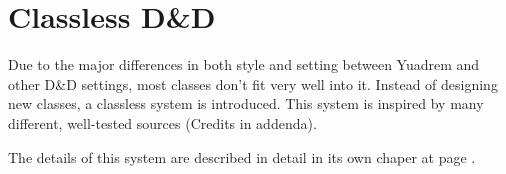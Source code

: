 \section*{Classless D\&D} \label{sec::classlessdnd}

Due to the major differences in both style and setting between Yuadrem and other D\&D settings, most classes don't fit very well into it.
Instead of designing new classes, a classless system is introduced.
This system is inspired by many different, well-tested sources (Credits in addenda).

The details of this system are described in detail in its own chaper at page \pageref{ch::classlessdnd}.
